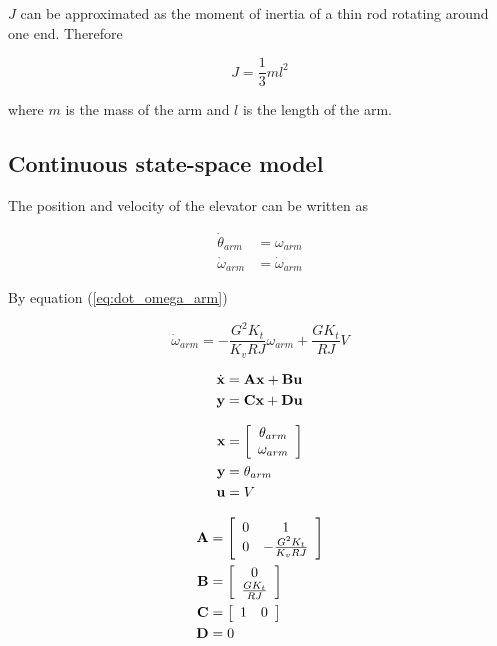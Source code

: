 $J$ can be approximated as the moment of inertia of a thin rod rotating around
one end. Therefore

\begin{equation}
  J = \frac{1}{3}ml^2
\end{equation}

where $m$ is the mass of the arm and $l$ is the length of the arm.

\subsection{Continuous state-space model}

The position and velocity of the elevator can be written as

\begin{align}
  \dot{\theta}_{arm} &= \omega_{arm} \label{eq:arm_cont_ss_pos} \\
  \dot{\omega}_{arm} &= \dot{\omega}_{arm} \label{eq:arm_cont_ss_vel}
\end{align}

By equation (\ref{eq:dot_omega_arm})

\begin{equation*}
  \dot{\omega}_{arm} = -\frac{G^2 K_t}{K_v RJ} \omega_{arm} + \frac{G K_t}{RJ} V
\end{equation*}

\begin{align*}
  \dot{\mathbf{x}} &= \mathbf{A} \mathbf{x} + \mathbf{B} \mathbf{u} \\
  \mathbf{y} &= \mathbf{C} \mathbf{x} + \mathbf{D} \mathbf{u}
\end{align*}

\begin{align*}
  \mathbf{x} &= \left[
  \begin{array}{c}
    \theta_{arm} \\
    \omega_{arm}
  \end{array}
  \right] \\
  \mathbf{y} &= \theta_{arm} \\
  \mathbf{u} &= V
\end{align*}

\begin{align}
  \mathbf{A} &= \left[
  \begin{array}{cc}
    0 & 1 \\
    0 & -\frac{G^2 K_t}{K_v RJ}
  \end{array}
  \right] \\
  \mathbf{B} &= \left[
  \begin{array}{c}
    0 \\
    \frac{G K_t}{RJ}
  \end{array}
  \right] \\
  \mathbf{C} &= \left[
  \begin{array}{cc}
    1 & 0
  \end{array}
  \right] \\
  \mathbf{D} &= 0
\end{align}

